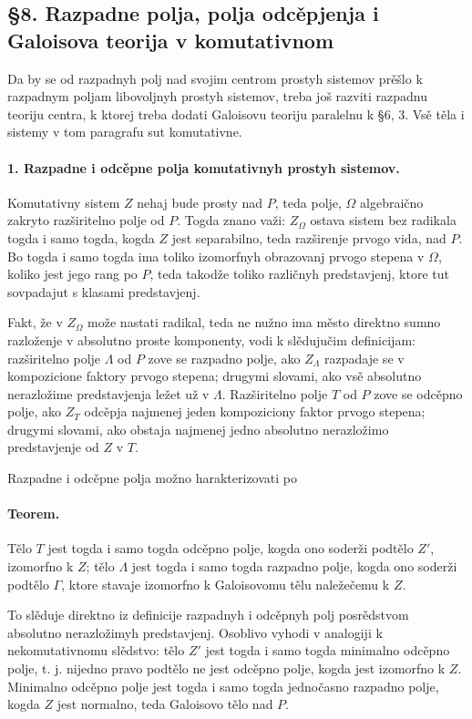 \documentclass[11pt]{article}
\begin{document}
\subsection*{§8. Razpadne polja, polja odcěpjenja i Galoisova teorija v komutativnom}

Da by se od razpadnyh polj nad svojim centrom prostyh sistemov prěšlo k razpadnym poljam libovoljnyh prostyh sistemov, treba još razviti razpadnu teoriju centra, k ktorej treba dodati Galoisovu teoriju paralelnu k §6, 3. Vsě těla i sistemy v tom paragrafu sut komutativne.

\paragraph{1. Razpadne i odcěpne polja komutativnyh prostyh sistemov.}
Komutativny sistem \(Z\) nehaj bude prosty nad \(P\), teda polje, \(\Omega\) algebraično zakryto razširitelno polje od \(P\). Togda znano važi: \(Z_\Omega\) ostava sistem bez radikala togda i samo togda, kogda \(Z\) jest separabilno, teda razširenje prvogo vida, nad \(P\). Bo togda i samo togda ima toliko izomorfnyh obrazovanj prvogo stepena v \(\Omega\), koliko jest jego rang po \(P\), teda takodže toliko različnyh predstavjenj, ktore tut sovpadajut s klasami predstavjenj.

Fakt, že v \(Z_\Omega\) može nastati radikal, teda ne nužno ima město direktno sumno razloženje v absolutno proste komponenty, vodi k slědujučim definicijam: razširitelno polje \(\Lambda\) od \(P\) zove se razpadno polje, ako \(Z_\Lambda\) razpadaje se v kompozicione faktory prvogo stepena; drugymi slovami, ako vsě absolutno nerazložime predstavjenja ležet už v \(\Lambda\). Razširitelno polje \(T\) od \(P\) zove se odcěpno polje, ako \(Z_T\) odcěpja najmenej jeden kompoziciony faktor prvogo stepena; drugymi slovami, ako obstaja najmenej jedno absolutno nerazložimo predstavjenje od \(Z\) v \(T\).

Razpadne i odcěpne polja možno harakterizovati po

\paragraph{Teorem.}
Tělo \(T\) jest togda i samo togda odcěpno polje, kogda ono soderži podtělo \(Z'\), izomorfno k \(Z\); tělo \(\Lambda\) jest togda i samo togda razpadno polje, kogda ono soderži podtělo \(\Gamma\), ktore stavaje izomorfno k Galoisovomu tělu naležečemu k \(Z\).

To slěduje direktno iz definicije razpadnyh i odcěpnyh polj posrědstvom absolutno nerazložimyh predstavjenj. Osoblivo vyhodi v analogiji k nekomutativnomu slědstvo: tělo \(Z'\) jest togda i samo togda minimalno odcěpno polje, t. j. nijedno pravo podtělo ne jest odcěpno polje, kogda jest izomorfno k \(Z\). Minimalno odcěpno polje jest togda i samo togda jednočasno razpadno polje, kogda \(Z\) jest normalno, teda Galoisovo tělo nad \(P\).
\end{document}
